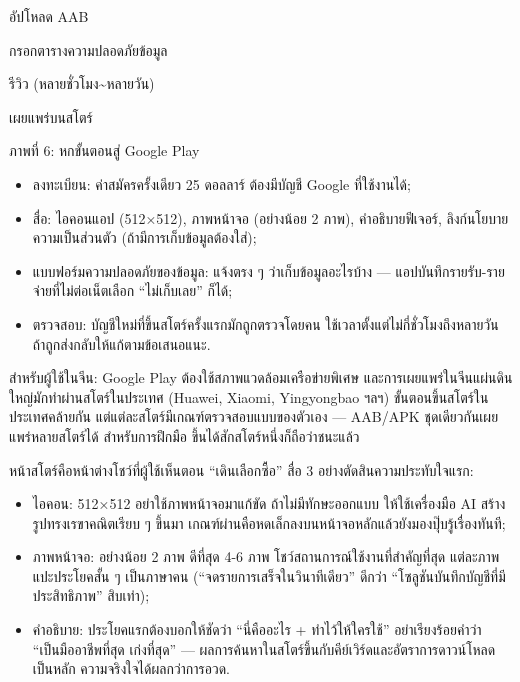 อัปโหลด AAB

กรอกตารางความปลอดภัยข้อมูล

รีวิว (หลายชั่วโมง\textasciitilde{}หลายวัน)

เผยแพร่บนสโตร์

\begin{center}\small\color{gray}ภาพที่ 6: หกขั้นตอนสู่ Google Play\end{center}

\begin{itemize}
  \item ลงทะเบียน: ค่าสมัครครั้งเดียว 25 ดอลลาร์ ต้องมีบัญชี Google ที่ใช้งานได้;
  \item สื่อ: ไอคอนแอป (512×512), ภาพหน้าจอ (อย่างน้อย 2 ภาพ), คำอธิบายฟีเจอร์, ลิงก์นโยบายความเป็นส่วนตัว (ถ้ามีการเก็บข้อมูลต้องใส่);
  \item แบบฟอร์มความปลอดภัยของข้อมูล: แจ้งตรง ๆ ว่าเก็บข้อมูลอะไรบ้าง — แอปบันทึกรายรับ-รายจ่ายที่ไม่ต่อเน็ตเลือก “ไม่เก็บเลย” ก็ได้;
  \item ตรวจสอบ: บัญชีใหม่ที่ขึ้นสโตร์ครั้งแรกมักถูกตรวจโดยคน ใช้เวลาตั้งแต่ไม่กี่ชั่วโมงถึงหลายวัน ถ้าถูกส่งกลับให้แก้ตามข้อเสนอแนะ.
\end{itemize}

สำหรับผู้ใช้ในจีน: Google Play ต้องใช้สภาพแวดล้อมเครือข่ายพิเศษ และการเผยแพร่ในจีนแผ่นดินใหญ่มักทำผ่านสโตร์ในประเทศ (Huawei, Xiaomi, Yingyongbao ฯลฯ) ขั้นตอนขึ้นสโตร์ในประเทศคล้ายกัน แต่แต่ละสโตร์มีเกณฑ์ตรวจสอบแบบของตัวเอง — AAB/APK ชุดเดียวกันเผยแพร่หลายสโตร์ได้ สำหรับการฝึกมือ ขึ้นได้สักสโตร์หนึ่งก็ถือว่าชนะแล้ว


หน้าสโตร์คือหน้าต่างโชว์ที่ผู้ใช้เห็นตอน “เดินเลือกซื้อ” สื่อ 3 อย่างตัดสินความประทับใจแรก:

\begin{itemize}
  \item ไอคอน: 512×512 อย่าใช้ภาพหน้าจอมาแก้ขัด ถ้าไม่มีทักษะออกแบบ ให้ใช้เครื่องมือ AI สร้างรูปทรงเรขาคณิตเรียบ ๆ ขึ้นมา เกณฑ์ผ่านคือหดเล็กลงบนหน้าจอหลักแล้วยังมองปุ๊บรู้เรื่องทันที;
  \item ภาพหน้าจอ: อย่างน้อย 2 ภาพ ดีที่สุด 4-6 ภาพ โชว์สถานการณ์ใช้งานที่สำคัญที่สุด แต่ละภาพแปะประโยคสั้น ๆ เป็นภาษาคน (“จดรายการเสร็จในวินาทีเดียว” ดีกว่า “โซลูชันบันทึกบัญชีที่มีประสิทธิภาพ” สิบเท่า);
  \item คำอธิบาย: ประโยคแรกต้องบอกให้ชัดว่า “นี่คืออะไร + ทำไว้ให้ใครใช้” อย่าเรียงร้อยคำว่า “เป็นมืออาชีพที่สุด เก่งที่สุด” — ผลการค้นหาในสโตร์ขึ้นกับคีย์เวิร์ดและอัตราการดาวน์โหลดเป็นหลัก ความจริงใจได้ผลกว่าการอวด.
\end{itemize}

